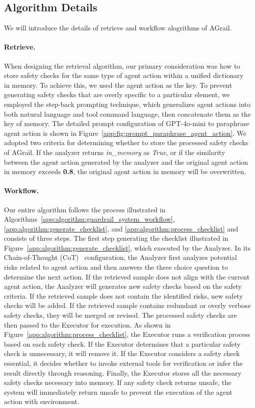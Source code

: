 \subsection{Algorithm Details}
\label{app:method:implement}
We will introduce the details of retrieve and workflow alogrithms of AGrail.
\paragraph{Retrieve.} When designing the retrieval algorithm, our primary consideration was how to store safety checks for the same type of agent action within a unified dictionary in memory. To achieve this, we used the agent action as the key. To prevent generating safety checks that are overly specific to a particular element, we employed the step-back prompting technique, which generalizes agent actions into both natural language and tool command language, then concatenate them as the key of memory. The detailed prompt configuration of GPT-4o-mini to paraphrase agent action is shown in Figure~\ref{app:fig:prompt_paraphrase_agent_action}. We adopted two criteria for determining whether to store the processed safety checks of AGrail. If the analyzer returns \textit{in\_memory} as \textit{True}, or if the similarity between the agent action generated by the analyzer and the original agent action in memory exceeds \textbf{0.8}, the original agent action in memory will be overwritten.
\paragraph{Workflow.} Our entire algorithm follows the process illustrated in Algorithms~\ref{app:algorithm:guardrail_system_workflow}, \ref{app:algorithm:generate_checklist}, and \ref{app:algorithm:process_checklist} and consists of three steps. The first step generating the checklist illustrated in Figure~\ref{app:algorithm:generate_checklist}, which executed by the Analyzer. In its Chain-of-Thought (CoT)~\cite{wei2023chainofthoughtpromptingelicitsreasoning, jin-etal-2024-impact} configuration, the Analyzer first analyzes potential risks related to agent action and then answers the three choice question to determine the next action. If the retrieved sample does not align with the current agent action, the Analyzer will generates new safety checks based on the safety criteria. If the retrieved sample does not contain the identified risks, new safety checks will be added. If the retrieved sample contains redundant or overly verbose safety checks, they will be merged or revised. The processed safety checks are then passed to the Executor for execution. As shown in Figure~\ref{app:algorithm:process_checklist}, the Executor runs a verification process based on each safety check. If the Executor determines that a particular safety check is unnecessary, it will remove it. If the Executor considers a safety check essential, it decides whether to invoke external tools for verification or infer the result directly through reasoning. Finally, the Executor stores all the necessary safety checks necessary into memory. If any safety check returns unsafe, the system will immediately return unsafe to prevent the execution of the agent action with environment.


